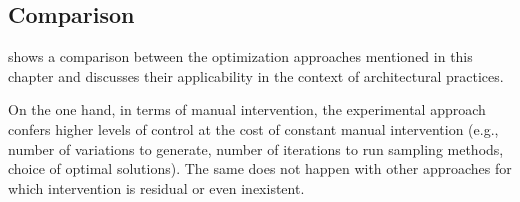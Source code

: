 	
	\subsection{Comparison}
	
	 shows a comparison between the optimization approaches mentioned in this chapter and discusses their applicability in the context of architectural practices.
	 
	On the one hand, in terms of manual intervention, the experimental approach confers higher levels of control at the cost of constant manual intervention (e.g., number of variations to generate, number of iterations to run sampling methods, choice of optimal solutions). The same does not happen with other approaches for which intervention is residual or even inexistent.	
	

